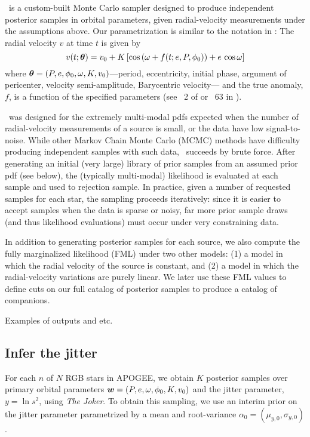 \documentclass[modern, letterpaper]{aastex61}
\newcommand{\thejoker}{\project{The~Joker}}
\begin{document}
\thejoker\ is a custom-built Monte Carlo sampler designed to produce independent
posterior samples in orbital parameters, given radial-velocity measurements
under the assumptions above.
Our parametrization is similar to the notation in \citet{Murray:2010}:
The radial velocity $v$ at time $t$ is given by
\begin{equation}
  v(t;\bs{\theta}) = v_0 + K\,[\cos\left(\omega + f(t; e, P, \phi_0)\right) +
    e\,\cos\omega]
\end{equation}
where $\boldsymbol{\theta} = (P,e,\phi_0,\omega,K,v_0)$---period, eccentricity, initial
phase, argument of pericenter, velocity semi-amplitude, Barycentric velocity---
and the true anomaly, $f$, is a function of the specified parameters (see
\sectionname~2 of \citealt{Price-Whelan:2017} or \eqname~63 in
\citealt{Murray:2010}).

\thejoker\ was designed for the extremely multi-modal pdfs expected when the
number of radial-velocity measurements of a source is small, or the data have
low signal-to-noise.
While other Markov Chain Monte Carlo (MCMC) methods have difficulty producing
independent samples with such data, \thejoker\ succeeds by brute force.
After generating an initial (very large) library of prior samples from an
assumed prior pdf (see below), the (typically multi-modal) likelihood is
evaluated at each sample and used to rejection sample.
In practice, given a number of requested samples for each star, the sampling
proceeds iteratively: since it is easier to accept samples when the data is
sparse or noisy, far more prior sample draws (and thus likelihood
evaluations) must occur under very constraining data.

In addition to generating posterior samples for each source, we also compute the
fully marginalized likelihood (FML) under two other models: (1) a model in which
the radial velocity of the source is constant, and (2) a model in which the
radial-velocity variations are purely linear.
We later use these FML values to define cuts on our full catalog of posterior
samples to produce a catalog of companions.


Examples of outputs and etc.

\subsection{Infer the jitter}

For each $n$ of $N$ RGB stars in APOGEE, we obtain $K$ posterior samples over
primary orbital parameters $\boldsymbol{w} = (P, e, \omega, \phi_0, K, v_0)$ and the
jitter parameter, $y = \ln s^2$, using {\it The Joker}.
To obtain this sampling, we use an interim prior on the jitter parameter
parametrized by a mean and root-variance $\alpha_0 = (\mu_{y,0}, \sigma_{y,0})$.
\end{document}
